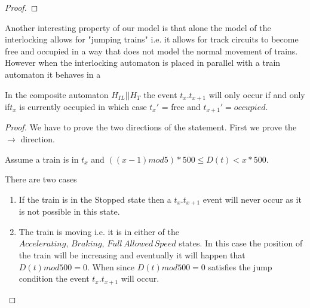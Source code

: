 \begin{mytheorem}
\begin{proof}

\end{proof}

\end{mytheorem}


Another interesting property of our model is that alone the model of the interlocking allows for "jumping trains" i.e. it allows for track circuits to become free and occupied in a way that does not model the normal movement of trains.
However when the interlocking automaton is placed in parallel with a train automaton it behaves in a

\begin{mytheorem}

In the composite automaton $H_{IL}|| H_{T} $  the event $t_x.t_{x+1}$ will only occur if  and only if$t_x$ is currently occupied in which case $t_x'$ = free and $t_{x+1}' = occupied$.


\begin{proof}
We have to prove the two directions of the statement. First we prove the $\to$ direction.




Assume a train is in $t_x$ and $((x-1) mod 5) * 500 \leq D(t) < x *500$.

There are two cases
\begin{enumerate}
\item If the train is in the Stopped state then a $t_{x}.t_{x+1}$ event will never occur as it is not possible in this state.

\item The train is moving i.e. it is in either of the $Accelerating, \, Braking , \,  Full \, Allowed \, Speed$ states. In this case the position of the train will be increasing and eventually it will happen that $D(t)  mod 500 = 0$. When since $D(t) mod 500 = 0$  satisfies the jump condition the event
 $t_{x}.t_{x+ 1}$ will occur.  
 

\end{enumerate}
\end{proof}
\end{mytheorem}


